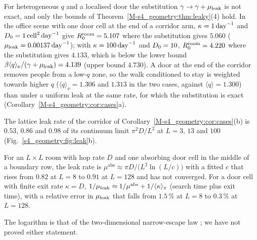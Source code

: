 For heterogeneous $q$ and a localised door the substitution $\gamma\to\gamma+\mu_{\mathrm{leak}}$ is not exact, and only
the bounds of Theorem~\ref{M-s4_geometry:thm:leaky}(4) hold. In the office scene with one door cell at the end
of a corridor arm, $\kappa=1\,\mathrm{day}^{-1}$ and $D_0=1\,\mathrm{cell}^2\,\mathrm{day}^{-1}$ give $R_0^{\mathrm{room}}=5.107$ where the substitution gives
$5.060$ ($\mu_{\mathrm{leak}}=0.00137\,\mathrm{day}^{-1}$); with $\kappa=100\,\mathrm{day}^{-1}$ and $D_0=10$, $R_0^{\mathrm{room}}=4.220$ where the substitution
gives $4.133$, which is below the lower bound $\beta\langle q\rangle_\nu/(\gamma+\mu_{\mathrm{leak}})=4.139$ (upper bound
$4.730$). A door at the end of the corridor removes people from a low-$q$ zone, so the walk conditioned to
stay is weighted towards higher $q$ ($\langle q\rangle_\nu=1.306$ and $1.313$ in the two cases, against
$\langle q\rangle=1.300$) than under a uniform leak at the same rate, for which the substitution is exact
(Corollary~\ref{M-s4_geometry:cor:cases}a).

The lattice leak rate of the corridor of Corollary~\ref{M-s4_geometry:cor:cases}(b) is $0.53$, $0.86$ and $0.98$ of its
continuum limit $\pi^2D/L^2$ at $L=3$, $13$ and $100$ (Fig.~\ref{s4_geometry:fig:leak}b).

\begin{observation}\label{s4_geometry:obs:door}
  For an $L\times L$ room with hop rate $D$ and one absorbing door cell in the middle of a boundary row, the
  leak rate is
  $\mu^{\mathrm{abs}}\approx\pi D/\bigl(L^2\ln(L/c)\bigr)$ with a fitted $c$ that rises from $0.82$ at $L=8$ to
  $0.91$ at $L=128$ and has not converged. For a door cell with finite exit rate $\kappa=D$,
  $1/\mu_{\mathrm{leak}}\approx1/\mu^{\mathrm{abs}}+1/\langle\kappa\rangle_\pi$ (search time plus exit time), with a relative
  error in $\mu_{\mathrm{leak}}$ that falls from $1.5\,\%$ at $L=8$ to $0.3\,\%$ at $L=128$.
\end{observation}
The logarithm is that of the two-dimensional narrow-escape law \citep{schuss2007narrow}; we have not proved
either statement.

